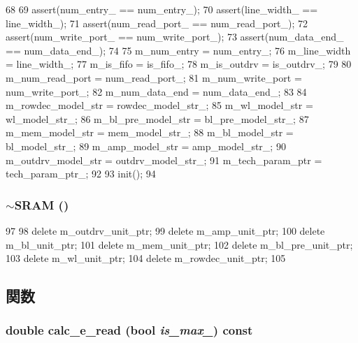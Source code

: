 \begin{DoxyCode}
68 {
69     assert(num_entry_ == num_entry_);
70     assert(line_width_ == line_width_);
71     assert(num_read_port_ == num_read_port_);
72     assert(num_write_port_ == num_write_port_);
73     assert(num_data_end_ == num_data_end_);
74 
75     m_num_entry = num_entry_;
76     m_line_width = line_width_;
77     m_is_fifo = is_fifo_;
78     m_is_outdrv = is_outdrv_;
79 
80     m_num_read_port = num_read_port_;
81     m_num_write_port = num_write_port_;
82     m_num_data_end = num_data_end_;
83 
84     m_rowdec_model_str =  rowdec_model_str_;
85     m_wl_model_str = wl_model_str_;
86     m_bl_pre_model_str = bl_pre_model_str_;
87     m_mem_model_str = mem_model_str_;
88     m_bl_model_str = bl_model_str_;
89     m_amp_model_str = amp_model_str_;
90     m_outdrv_model_str = outdrv_model_str_;
91     m_tech_param_ptr = tech_param_ptr_;
92 
93     init();
94 }
\end{DoxyCode}
\hypertarget{classSRAM_a28d511ec0a18d1bf56ad56afad48d349}{
\subsubsection[{$\sim$SRAM}]{\setlength{\rightskip}{0pt plus 5cm}$\sim${\bf SRAM} ()}}
\label{classSRAM_a28d511ec0a18d1bf56ad56afad48d349}



\begin{DoxyCode}
97 {
98     delete m_outdrv_unit_ptr;
99     delete m_amp_unit_ptr;
100     delete m_bl_unit_ptr;
101     delete m_mem_unit_ptr;
102     delete m_bl_pre_unit_ptr;
103     delete m_wl_unit_ptr;
104     delete m_rowdec_unit_ptr;
105 }
\end{DoxyCode}


\subsection{関数}
\hypertarget{classSRAM_a3308b493960fdd7d2a292786eaba976c}{
\subsubsection[{calc\_\-e\_\-read}]{\setlength{\rightskip}{0pt plus 5cm}double calc\_\-e\_\-read (bool {\em is\_\-max\_\-}) const}}
\label{classSRAM_a3308b493960fdd7d2a292786eaba976c}



